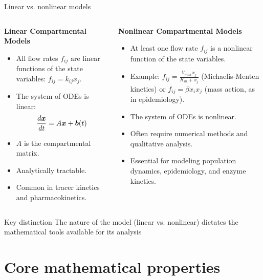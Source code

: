 \documentclass[aspectratio=169]{beamer}\usepackage[]{graphicx}\usepackage[]{xcolor}
\begin{document}
\begin{frame}{Linear vs. nonlinear models}
    \begin{columns}
        \begin{column}{0.5\textwidth}
            \textbf{Linear Compartmental Models}
            \begin{itemize}
                \item All flow rates $f_{ij}$ are linear functions of the state variables: $f_{ij} = k_{ij}x_j$.
                \item The system of ODEs is linear:
                $$ \frac{d\bm{x}}{dt} = A\bm{x} + \bm{b}(t) $$
                \item $A$ is the compartmental matrix.
                \item Analytically tractable.
                \item Common in tracer kinetics and pharmacokinetics.
            \end{itemize}
        \end{column}
        \begin{column}{0.5\textwidth}
            \textbf{Nonlinear Compartmental Models}
            \begin{itemize}
                \item At least one flow rate $f_{ij}$ is a nonlinear function of the state variables.
                \item Example: $f_{ij} = \frac{V_{max} x_j}{K_m + x_j}$ (Michaelis-Menten kinetics) or $f_{ij} = \beta x_i x_j$ (mass action, as in epidemiology).
                \item The system of ODEs is nonlinear.
                \item Often require numerical methods and qualitative analysis.
                \item Essential for modeling population dynamics, epidemiology, and enzyme kinetics.
            \end{itemize}
        \end{column}
    \end{columns}
    \vfill
    \begin{alertblock}{Key distinction}
        The nature of the model (linear vs. nonlinear) dictates the mathematical tools available for its analysis
    \end{alertblock}
\end{frame}

\section{Core mathematical properties}
\end{document}

